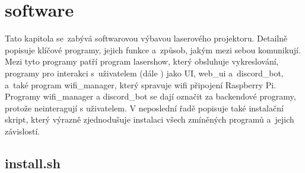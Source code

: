 \chapter{software}

Tato kapitola se~zabývá softwarovou výbavou laserového projektoru. Detailně popisuje klíčové programy, jejich funkce a~způsob, jakým mezi sebou komunikují.
Mezi tyto programy patří program lasershow, který obsluhuje vykreslování, programy pro interakci s~uživatelem (dále ) jako UI, web\_ui a~discord\_bot, a~také program wifi\_manager, který spravuje wifi připojení Raspberry Pi. Programy wifi\_manager a discord\_bot se dají označit za backendové programy, protože neinteragují s uživatelem. V neposlední řadě popisuje také instalační skript, který výrazně zjednodušuje instalaci všech zmíněných programů a~jejich závislostí.










\section{install.sh}
